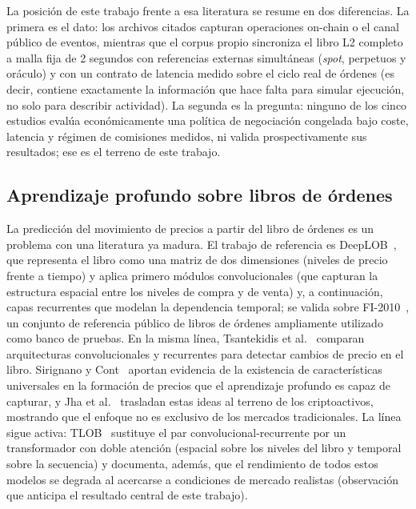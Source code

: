 La posición de este trabajo frente a esa literatura se resume en dos diferencias.
La primera es el dato: los archivos citados capturan operaciones on-chain o el canal
público de eventos, mientras que el corpus propio sincroniza el libro L2 completo a
malla fija de 2 segundos con referencias externas simultáneas (\emph{spot},
perpetuos y oráculo) y con un contrato de latencia medido sobre el ciclo real de
órdenes (es decir, contiene exactamente la información que hace falta para simular
ejecución, no solo para describir actividad). La segunda es la pregunta: ninguno de
los cinco estudios evalúa económicamente una política de negociación congelada bajo
coste, latencia y régimen de comisiones medidos, ni valida prospectivamente sus
resultados; ese es el terreno de este trabajo.

\subsection{Aprendizaje profundo sobre libros de órdenes}

La predicción del movimiento de precios a partir del libro de órdenes es un problema con
una literatura ya madura. El trabajo de referencia es DeepLOB~\cite{zhang2019deeplob}, que
representa el libro como una matriz de dos dimensiones (niveles de precio frente a tiempo) y
aplica primero módulos convolucionales (que capturan la estructura espacial entre los
niveles de compra y de venta) y, a continuación, capas recurrentes que modelan la
dependencia temporal; se valida sobre FI-2010~\cite{ntakaris2018}, un conjunto de referencia
público de libros de órdenes ampliamente utilizado como banco de pruebas. En la misma línea,
Tsantekidis et al.~\cite{tsantekidis2017} comparan arquitecturas convolucionales y
recurrentes para detectar cambios de precio en el libro. Sirignano y
Cont~\cite{sirignano2019universal} aportan evidencia de la existencia de características
universales en la formación de precios que el aprendizaje profundo es capaz de capturar, y
Jha et al.~\cite{jha2020digital} trasladan estas ideas al terreno de los criptoactivos,
mostrando que el enfoque no es exclusivo de los mercados tradicionales. La línea sigue
activa: TLOB~\cite{berti2025tlob} sustituye el par convolucional-recurrente por un
transformador con doble atención (espacial sobre los niveles del libro y temporal sobre
la secuencia) y documenta, además, que el rendimiento de todos estos modelos se degrada
al acercarse a condiciones de mercado realistas (observación que anticipa el resultado
central de este trabajo).

